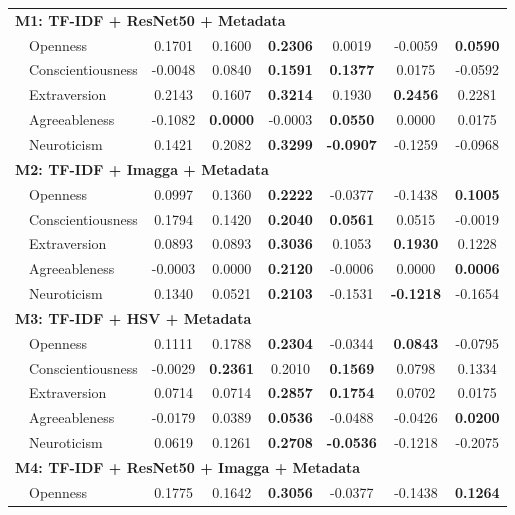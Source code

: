 \begin{longtable}{llcccccc}
\hline
\multicolumn{8}{l}{\textbf{M1: TF-IDF + ResNet50 + Metadata}} \\
& Openness & 0.1701 & 0.1600 & \textbf{0.2306} & 0.0019 & -0.0059 & \textbf{0.0590} \\
& Conscientiousness & -0.0048 & 0.0840 & \textbf{0.1591} & \textbf{0.1377} & 0.0175 & -0.0592 \\
& Extraversion & 0.2143 & 0.1607 & \textbf{0.3214} & 0.1930 & \textbf{0.2456} & 0.2281 \\
& Agreeableness & -0.1082 & \textbf{0.0000} & -0.0003 & \textbf{0.0550} & 0.0000 & 0.0175 \\
& Neuroticism & 0.1421 & 0.2082 & \textbf{0.3299} & \textbf{-0.0907} & -0.1259 & -0.0968 \\
\hline
\multicolumn{8}{l}{\textbf{M2: TF-IDF + Imagga + Metadata}} \\
& Openness & 0.0997 & 0.1360 & \textbf{0.2222} & -0.0377 & -0.1438 & \textbf{0.1005} \\
& Conscientiousness & 0.1794 & 0.1420 & \textbf{0.2040} & \textbf{0.0561} & 0.0515 & -0.0019 \\
& Extraversion & 0.0893 & 0.0893 & \textbf{0.3036} & 0.1053 & \textbf{0.1930} & 0.1228 \\
& Agreeableness & -0.0003 & 0.0000 & \textbf{0.2120} & -0.0006 & 0.0000 & \textbf{0.0006} \\
& Neuroticism & 0.1340 & 0.0521 & \textbf{0.2103} & -0.1531 & \textbf{-0.1218} & -0.1654 \\
\hline
\multicolumn{8}{l}{\textbf{M3: TF-IDF + HSV + Metadata}} \\
& Openness & 0.1111 & 0.1788 & \textbf{0.2304} & -0.0344 & \textbf{0.0843} & -0.0795 \\
& Conscientiousness & -0.0029 & \textbf{0.2361} & 0.2010 & \textbf{0.1569} & 0.0798 & 0.1334 \\
& Extraversion & 0.0714 & 0.0714 & \textbf{0.2857} & \textbf{0.1754} & 0.0702 & 0.0175 \\
& Agreeableness & -0.0179 & 0.0389 & \textbf{0.0536} & -0.0488 & -0.0426 & \textbf{0.0200} \\
& Neuroticism & 0.0619 & 0.1261 & \textbf{0.2708} & \textbf{-0.0536} & -0.1218 & -0.2075 \\
\hline
\multicolumn{8}{l}{\textbf{M4: TF-IDF + ResNet50 + Imagga + Metadata}} \\
& Openness & 0.1775 & 0.1642 & \textbf{0.3056} & -0.0377 & -0.1438 & \textbf{0.1264} \\

\end{longtable}
